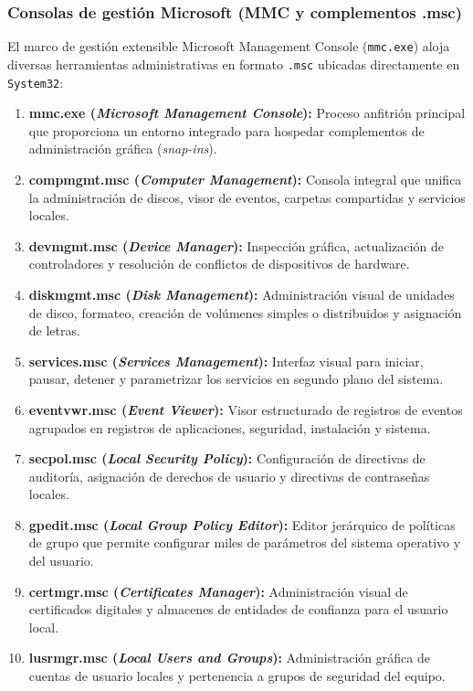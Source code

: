 \documentclass[12pt]{article}
\begin{document}
\subsubsection{Consolas de gestión Microsoft (MMC y complementos .msc)}
El marco de gestión extensible Microsoft Management Console (\texttt{mmc.exe}) aloja diversas herramientas administrativas en formato \texttt{.msc} ubicadas directamente en \texttt{System32}:
\begin{enumerate}[leftmargin=*, noitemsep, topsep=1pt]
    \item \textbf{mmc.exe (\textit{Microsoft Management Console}):} Proceso anfitrión principal que proporciona un entorno integrado para hospedar complementos de administración gráfica (\textit{snap-ins}).
    \item \textbf{compmgmt.msc (\textit{Computer Management}):} Consola integral que unifica la administración de discos, visor de eventos, carpetas compartidas y servicios locales.
    \item \textbf{devmgmt.msc (\textit{Device Manager}):} Inspección gráfica, actualización de controladores y resolución de conflictos de dispositivos de hardware.
    \item \textbf{diskmgmt.msc (\textit{Disk Management}):} Administración visual de unidades de disco, formateo, creación de volúmenes simples o distribuidos y asignación de letras.
    \item \textbf{services.msc (\textit{Services Management}):} Interfaz visual para iniciar, pausar, detener y parametrizar los servicios en segundo plano del sistema.
    \item \textbf{eventvwr.msc (\textit{Event Viewer}):} Visor estructurado de registros de eventos agrupados en registros de aplicaciones, seguridad, instalación y sistema.
    \item \textbf{secpol.msc (\textit{Local Security Policy}):} Configuración de directivas de auditoría, asignación de derechos de usuario y directivas de contraseñas locales.
    \item \textbf{gpedit.msc (\textit{Local Group Policy Editor}):} Editor jerárquico de políticas de grupo que permite configurar miles de parámetros del sistema operativo y del usuario.
    \item \textbf{certmgr.msc (\textit{Certificates Manager}):} Administración visual de certificados digitales y almacenes de entidades de confianza para el usuario local.
    \item \textbf{lusrmgr.msc (\textit{Local Users and Groups}):} Administración gráfica de cuentas de usuario locales y pertenencia a grupos de seguridad del equipo.
\end{enumerate}
\end{document}
